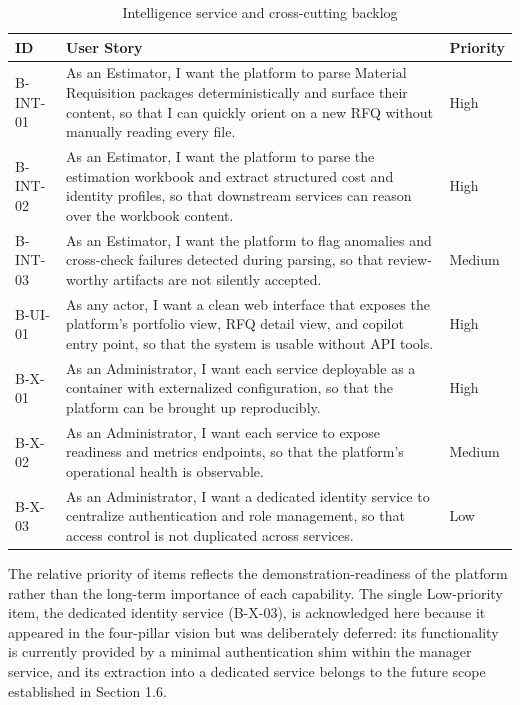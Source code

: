 \begin{table}[H]
\centering
\renewcommand{\arraystretch}{1.3}
\begin{tabular}{|p{1.4cm}|p{10.6cm}|p{1.5cm}|}
\hline
\rowcolor{lightgray}
\textbf{ID} & \textbf{User Story} & \textbf{Priority} \\ \hline
B-INT-01 & As an Estimator, I want the platform to parse Material Requisition packages deterministically and surface their content, so that I can quickly orient on a new RFQ without manually reading every file. & High \\ \hline
B-INT-02 & As an Estimator, I want the platform to parse the estimation workbook and extract structured cost and identity profiles, so that downstream services can reason over the workbook content. & High \\ \hline
B-INT-03 & As an Estimator, I want the platform to flag anomalies and cross-check failures detected during parsing, so that review-worthy artifacts are not silently accepted. & Medium \\ \hline
B-UI-01 & As any actor, I want a clean web interface that exposes the platform's portfolio view, RFQ detail view, and copilot entry point, so that the system is usable without API tools. & High \\ \hline
B-X-01 & As an Administrator, I want each service deployable as a container with externalized configuration, so that the platform can be brought up reproducibly. & High \\ \hline
B-X-02 & As an Administrator, I want each service to expose readiness and metrics endpoints, so that the platform's operational health is observable. & Medium \\ \hline
B-X-03 & As an Administrator, I want a dedicated identity service to centralize authentication and role management, so that access control is not duplicated across services. & Low \\ \hline
\end{tabular}
\caption{Intelligence service and cross-cutting backlog}
\label{tab:backlog_intelligence}
\end{table}

The relative priority of items reflects the demonstration-readiness of the platform rather than the long-term importance of each capability. The single Low-priority item, the dedicated identity service (B-X-03), is acknowledged here because it appeared in the four-pillar vision but was deliberately deferred: its functionality is currently provided by a minimal authentication shim within the manager service, and its extraction into a dedicated service belongs to the future scope established in Section 1.6.

